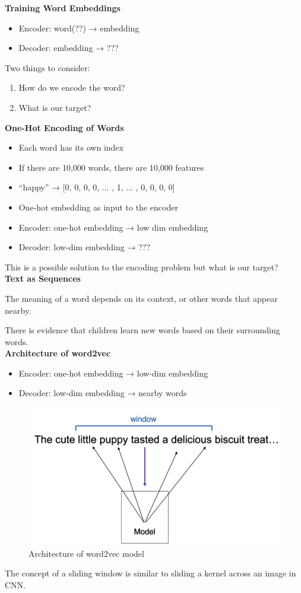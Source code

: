 \noindent\textbf{Training Word Embeddings}
\begin{itemize}
    \item Encoder: word(??) → embedding
    \item Decoder: embedding → ???
\end{itemize}
\indent Two things to consider:
\begin{enumerate}
    \item How do we encode the word?
    \item What is our target?
\end{enumerate}

\noindent\textbf{One-Hot Encoding of Words}
\begin{itemize}
    \item Each word has its own index
    \item If there are 10,000 words, there are 10,000 features
    \item “happy” → [0, 0, 0, 0, ... , 1, ... , 0, 0, 0, 0]
    \item One-hot embedding as input to the encoder
    \item Encoder: one-hot embedding → low dim embedding
    \item Decoder: low-dim embedding → ???
\end{itemize}
This is a possible solution to the encoding problem but what is our target?\\

\noindent\textbf{Text as Sequences}
\begin{idea}
    The meaning of a word depends on its context, or other words that appear nearby.
\end{idea}
There is evidence that children learn new words based on their surrounding words.\\

\textbf{Architecture of word2vec}
\begin{itemize}
    \item Encoder: one-hot embedding → low-dim embedding
    \item Decoder: low-dim embedding → nearby words
\end{itemize}

\begin{figure}[h!t]
    \centering
    \includegraphics[width=0.5\linewidth]{architectureofword2vec.png}
    \caption{Architecture of word2vec model}
    \label{fig:enter-label}
\end{figure}
\begin{idea}
    The concept of a sliding window is similar to sliding a kernel across an image in CNN.
\end{idea}


